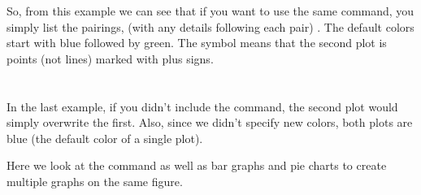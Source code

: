 So, from this example we can see that if you want to use the same  command, you simply list the pairings, (with any details following each pair) .  The default colors start with blue followed by green.  The symbol {\color{myred} \cour{\textquotesingle +\textquotesingle}} means that the second plot is points (not lines) marked with plus signs.\\\\

\\

In the last example, if you didn't include the  command, the second plot would simply overwrite the first.  Also, since we didn't specify new colors, both plots are blue (the default color of a single plot). 

Here we look at the  command as well as bar graphs and pie charts to create multiple graphs on the same figure.\\

